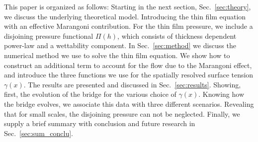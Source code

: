 \documentclass[twocolumn,amsmath,amssymb,showpacs,nofootinbib,prfluids,superscriptaddress]{revtex4-2} %
\begin{document}
This paper is organized as follows:
Starting in the next section, Sec.~\ref{sec:theory}, we discuss the underlying theoretical model.
Introducing the thin film equation with an effective Marangoni contribution. 
For the thin film pressure, we include a disjoining pressure functional $\Pi(h)$, which consists of thickness dependent power-law and a wettability component. 
In Sec.~\ref{sec:method} we discuss the numerical method we use to solve the thin film equation.
We show how to construct an additional term to account for the flow due to the Marangoni effect, and
introduce the three functions we use for the spatially resolved surface tension $\gamma(x)$. 
The results are presented and discussed in Sec.~\ref{sec:results}.
Showing, first, the evolution of the bridge for the various choice of $\gamma(x)$.
Knowing how the bridge evolves, we associate this data with three different scenarios.
Revealing that for small scales, the disjoining pressure can not be neglected.
Finally, we supply a brief summary with conclusion and future research in Sec.~\ref{sec:sum_conclu}. 
\end{document}
